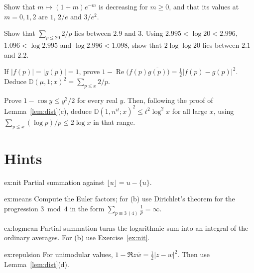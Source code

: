 \begin{exercise}[$\star$]\label{ex:v14-extra-10-1}
Show that $m\mapsto(1+m)e^{-m}$ is decreasing for $m\ge0$, and that its values at $m=0,1,2$ are $1$, $2/e$ and $3/e^2$.
\end{exercise}

\begin{exercise}[$\star$]\label{ex:v14-extra-10-2}
Show that $\sum_{p\le20}2/p$ lies between $2.9$ and $3$. Using $2.995<\log20<2.996$, $1.096<\log2.995$ and $\log2.996<1.098$, show that $2\log\log20$ lies between $2.1$ and $2.2$.
\end{exercise}

\begin{exercise}[$\star\star$]\label{ex:v14-extra-10-3}
If $|f(p)|=|g(p)|=1$, prove $1-\operatorname{Re}\bigl(f(p)\overline{g(p)}\bigr)=\frac12|f(p)-g(p)|^2$. Deduce $\mathbb D(\mu,1;x)^2=\sum_{p\le x}2/p$.
\end{exercise}

\begin{exercise}[$\star\star\star$]\label{ex:v14-extra-10-4}
Prove $1-\cos y\le y^2/2$ for every real $y$. Then, following the proof of Lemma~\ref{lem:dist}(c), deduce $\mathbb D(1,n^{it};x)^2\le t^2\log^2 x$ for all large $x$, using $\sum_{p\le x}(\log p)/p\le2\log x$ in that range.
\end{exercise}

\section{Hints}

\begin{hint}{ex:nit}
Partial summation against $\lfloor u\rfloor=u-\{u\}$.
\end{hint}

\begin{hint}{ex:means}
Compute the Euler factors; for (b) use Dirichlet's theorem for the progression $3\bmod4$ in the form $\sum_{p\equiv3\,(4)}\frac1p=\infty$.
\end{hint}

\begin{hint}{ex:logmean}
Partial summation turns the logarithmic sum into an integral of the ordinary averages. For (b) use Exercise~\ref{ex:nit}.
\end{hint}

\begin{hint}{ex:repulsion}
For unimodular values, $1-\Re z\bar w=\frac12|z-w|^2$. Then use Lemma~\ref{lem:dist}(d).
\end{hint}

